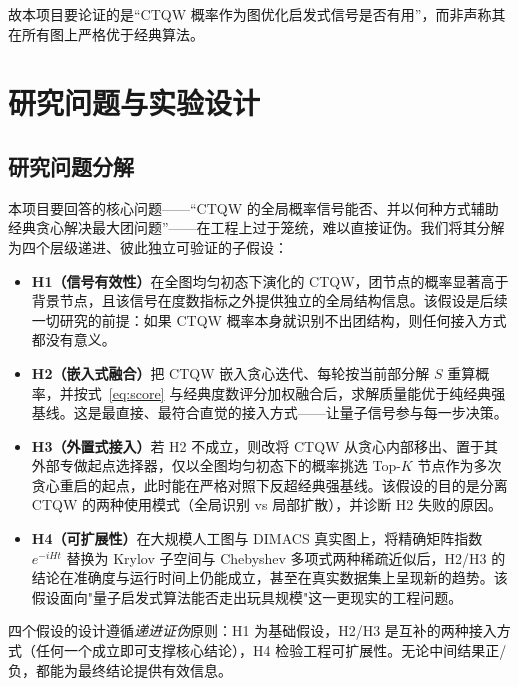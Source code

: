 \documentclass[pre,twocolumn]{revtex4-2}
\begin{document}
故本项目要论证的是“CTQW 概率作为图优化启发式信号是否有用”，而非声称其在所有图上严格优于经典算法。

\section{研究问题与实验设计}

\subsection{研究问题分解}
本项目要回答的核心问题——“CTQW 的全局概率信号能否、并以何种方式辅助经典贪心解决最大团问题”——在工程上过于笼统，难以直接证伪。我们将其分解为四个层级递进、彼此独立可验证的子假设：
\begin{itemize}
    \item \textbf{H1（信号有效性）}\quad 在全图均匀初态下演化的 CTQW，团节点的概率显著高于背景节点，且该信号在度数指标之外提供独立的全局结构信息。该假设是后续一切研究的前提：如果 CTQW 概率本身就识别不出团结构，则任何接入方式都没有意义。
    \item \textbf{H2（嵌入式融合）}\quad 把 CTQW 嵌入贪心迭代、每轮按当前部分解 $S$ 重算概率，并按式~\eqref{eq:score} 与经典度数评分加权融合后，求解质量能优于纯经典强基线。这是最直接、最符合直觉的接入方式——让量子信号参与每一步决策。
    \item \textbf{H3（外置式接入）}\quad 若 H2 不成立，则改将 CTQW 从贪心内部移出、置于其外部专做起点选择器，仅以全图均匀初态下的概率挑选 Top-$K$ 节点作为多次贪心重启的起点，此时能在严格对照下反超经典强基线。该假设的目的是分离 CTQW 的两种使用模式（全局识别 vs 局部扩散），并诊断 H2 失败的原因。
    \item \textbf{H4（可扩展性）}\quad 在大规模人工图与 DIMACS 真实图上，将精确矩阵指数 $e^{-iHt}$ 替换为 Krylov 子空间与 Chebyshev 多项式两种稀疏近似后，H2/H3 的结论在准确度与运行时间上仍能成立，甚至在真实数据集上呈现新的趋势。该假设面向"量子启发式算法能否走出玩具规模"这一更现实的工程问题。
\end{itemize}

四个假设的设计遵循\emph{递进证伪}原则：H1 为基础假设，H2/H3 是互补的两种接入方式（任何一个成立即可支撑核心结论），H4 检验工程可扩展性。无论中间结果正/负，都能为最终结论提供有效信息。
\end{document}
